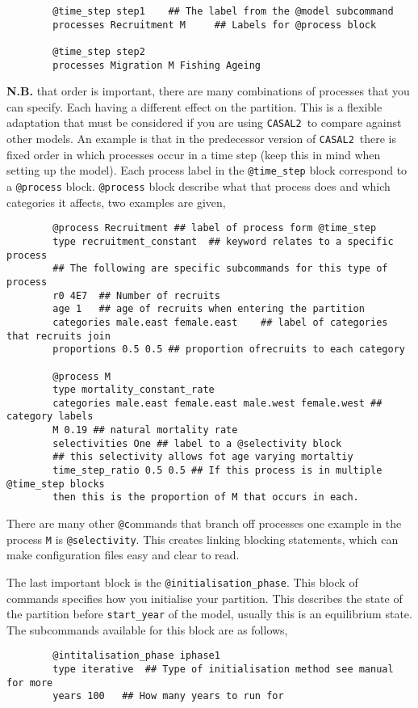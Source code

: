 \documentclass[12pt]{article}
\makeatletter
\newcommand{\cas}{\texttt{CASAL2}}
\newcommand{\command}[1] {\texttt{@#1}}
\makeatother
\begin{document}
{\small{\begin{verbatim}
		@time_step step1 	## The label from the @model subcommand
		processes Recruitment M 	## Labels for @process block
		
		@time_step step2 
		processes Migration M Fishing Ageing
		\end{verbatim}}}

\textbf{N.B.} that order is important, there are many combinations of processes that you can specify. Each having a different effect on the partition. This is a flexible adaptation that must be considered if you are using \cas\ to compare against other models. An example is that in the predecessor version of \cas\ there is fixed order in which processes occur in a time step (keep this in mind when setting up the model). Each process label in the \command{time\_step} block correspond to a \command{process} block. \command{process} block describe what that process does and which categories it affects, two examples are given,

{\small{\begin{verbatim}
		@process Recruitment ## label of process form @time_step
		type recruitment_constant  ## keyword relates to a specific process
		## The following are specific subcommands for this type of process
		r0 4E7	## Number of recruits
		age 1	## age of recruits when entering the partition
		categories male.east female.east	## label of categories that recruits join
		proportions 0.5 0.5	## proportion ofrecruits to each category
		
		@process M 
		type mortality_constant_rate
		categories male.east female.east male.west female.west ## category labels
		M 0.19 ## natural mortality rate
		selectivities One ## label to a @selectivity block
		## this selectivity allows fot age varying mortaltiy
		time_step_ratio 0.5 0.5 ## If this process is in multiple @time_step blocks
		then this is the proportion of M that occurs in each.
		\end{verbatim}}}

There are many other \command commands that branch off processes one example in the process \texttt{M} is \command{selectivity}. This creates linking blocking statements, which can make configuration files easy and clear to read.


The last important block is the \command{initialisation\_phase}. This block of commands specifies how you initialise your partition. This describes the state of the partition before \texttt{start\_year} of the model, usually this is an equilibrium state. The subcommands available for this block are as follows,
{\small{\begin{verbatim}
		@intitalisation_phase iphase1
		type iterative	## Type of initialisation method see manual for more
		years 100	## How many years to run for
		\end{verbatim}}}
\end{document}

